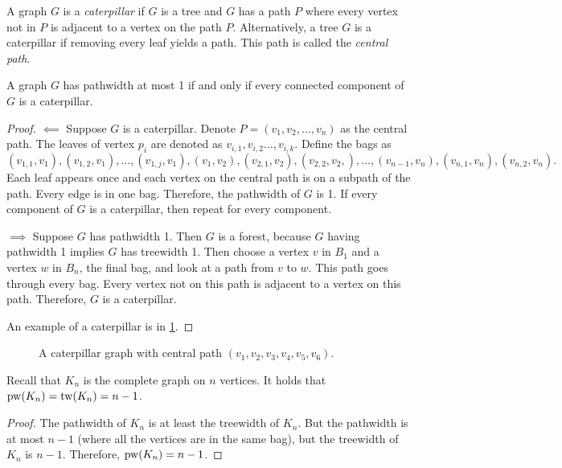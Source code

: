 A graph \(G\) is a \textit{caterpillar} if \(G\) is a tree and $G$ has a path \(P\) where every vertex not in $P$ is adjacent to a vertex on the path \(P\). Alternatively, a tree \(G\) is a caterpillar if removing every leaf yields a path. This path is called the \textit{central path}.
\begin{proposition}
	A graph $G$ has pathwidth at most 1 if and only if every connected component of $G$ is a caterpillar.
\end{proposition}
\begin{proof}
	$\impliedby$ Suppose \(G\) is a caterpillar.
	Denote \(P =\left( v_1, v_2, \ldots, v_n\right)\) as the central path. The leaves of vertex \(p_i\) are denoted as \(v_{i, 1}, v_{i, 2} \dots, v_{i, k}\). Define the bags as
	\begin{equation*}
		(v_{1, 1}, v_1), (v_{1, 2}, v_1) ,\ldots ,(v_{1, j}, v_1),  (v_1, v_2), (v_{2, 1}, v_2), (v_{2,2}, v_2,),\ldots ,(v_{n-1}, v_n), (v_{n,1}, v_n), (v_{n,2}, v_n) .
	\end{equation*}
	Each leaf appears once and each vertex on the central path is on a subpath of the path. Every edge is in one bag. Therefore, the pathwidth of \(G\) is 1. If every component of $G$ is a caterpillar, then repeat for every component.

	$\implies$ Suppose \(G\) has pathwidth 1. Then $G$ is a forest, because $G$ having pathwidth 1 implies $G$ has treewidth 1. Then choose a vertex \(v\) in \(B_1\) and a vertex \(w\) in \(B_n\), the final bag, and look at a path from \(v\) to \(w\). This path goes through every bag. Every vertex not on this path is adjacent to a vertex on this path. Therefore, $G$ is a caterpillar. 
	
	An example of a caterpillar is in \cref{fig:caterpillar}.
\end{proof}
\begin{figure}[h!]
	\centering
	
	\caption[Caterpillar graph]{A caterpillar graph with central path \((v_1, v_2, v_3, v_4, v_5, v_6)\).}\label{fig:caterpillar}
\end{figure}

\begin{example}
	Recall that $K_n$ is the complete graph on $n$ vertices. It holds that \(\operatorname{pw}(K_n) = \operatorname{tw}(K_n) = n - 1\).
\end{example}
\begin{proof}
	The pathwidth of \(K_n\) is at least the treewidth of \(K_n\). But the pathwidth is at most \(n- 1\) (where all the vertices are in the same bag), but the treewidth of \(K_n\) is \(n - 1\). Therefore, \(\operatorname{pw}(K_n) = n - 1\).
\end{proof}

